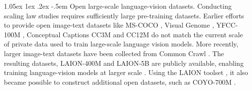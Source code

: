 \documentclass[11pt,table]{article}
\makeatletter
\newcommand{\citep}{\cite}
\renewcommand\paragraph{\@startsection{paragraph}{4}{\z@}                                     {1.05ex \@plus1ex \@minus.2ex}                                {-.5em}
{\normalfont\normalsize\bfseries}}
\makeatother
\begin{document}
\paragraph{Open large-scale language-vision datasets.} Conducting scaling law studies requires sufficiently large pre-training datasets. Earlier efforts to provide open image-text datasets like MS-COCO \citep{lin2014microsoft}, Visual Genome \citep{krishna2017visual}, YFCC-100M \citep{thomee2016yfcc100m}, Conceptual Captions CC3M and CC12M \citep{sharma-etal-2018-conceptual,hu2021scaling} do not match the current scale of private data used to train large-scale language vision models. More recently, larger image-text datasets have been collected from Common Crawl \citep{common_crawl}. The resulting datasets, LAION-400M \citep{schuhmann2021laion} and LAION-5B \citep{Schuhmann2022} are publicly available, enabling training language-vision models at larger scale \citep{rombach2021highresolution, mustafa2022multimodal, ho2022imagen}. Using the LAION toolset \citep{Schuhmann2022}, it also became possible to construct additional open datasets, such as COYO-700M \citep{kakaobrain2022coyo-700m}. 




\end{document}

